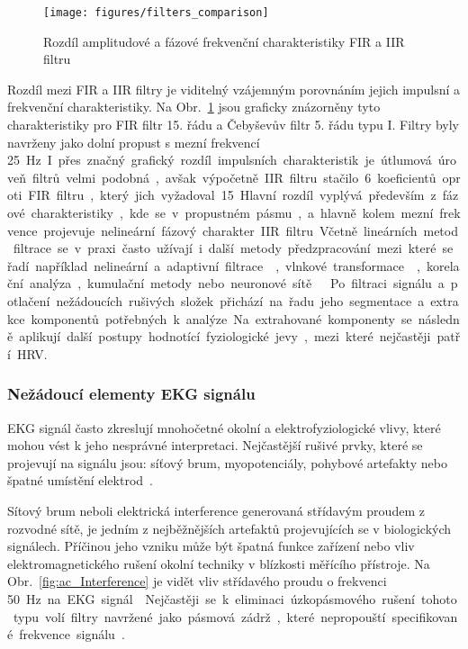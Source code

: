 \begin{figure}[h]
	\begin{center}
		\texttt{[image: figures/filters\_comparison]}
		\caption{Rozdíl amplitudové a fázové frekvenční charakteristiky FIR a IIR filtru}
		\label{fig:filters_comparison}
	\end{center}
\end{figure}

Rozdíl mezi FIR a IIR filtry je viditelný vzájemným porovnáním jejich impulsní a
frekvenční charakteristiky. Na Obr.~\ref{fig:filters_comparison} jsou graficky
znázorněny tyto charakteristiky pro FIR filtr 15. řádu a Čebyševův filtr 5. řádu
typu I. Filtry byly navrženy jako dolní propust s mezní frekvencí 25~\si\Hz. I
přes značný grafický rozdíl impulsních charakteristik je útlumová úroveň filtrů
velmi podobná, avšak výpočetně IIR filtru stačilo 6 koeficientů oproti FIR
filtru, který jich vyžadoval 15. Hlavní rozdíl vyplývá především z fázové
charakteristiky, kde se v propustném pásmu, a hlavně kolem mezní frekvence
projevuje nelineární fázový charakter IIR filtru.

Včetně lineárních metod filtrace se v praxi často užívají i další metody
předzpracování mezi které se řadí například nelineární a adaptivní
filtrace~\cite{Sornmo1982,Pan1985}, vlnkové
transformace~\cite{Yao2020,Ndiaye2020}, korelační analýza, kumulační metody nebo
neuronové sítě~\cite{Kiranyaz2016,Zhai2018}~\cite{Jan2002}. Po filtraci signálu
a potlačení nežádoucích rušivých složek přichází na řadu jeho segmentace a
extrakce komponentů potřebných k analýze. Na extrahované komponenty se následně
aplikují další postupy hodnotící fyziologické jevy, mezi které nejčastěji patří
HRV.

\subsubsection{Nežádoucí elementy EKG signálu}
\label{section:artifacts_theory}
EKG signál často zkreslují mnohočetné okolní a elektrofyziologické vlivy, které
mohou vést k jeho nesprávné interpretaci. Nejčastější rušivé prvky, které se
projevují na signálu jsou: síťový brum, myopotenciály, pohybové artefakty nebo
špatné umístění elektrod~\cite{Surawicz2008}.

Sítový brum neboli elektrická interference generovaná střídavým proudem z
rozvodné sítě, je jedním z nejběžnějších artefaktů projevujících se v
biologických signálech. Příčinou jeho vzniku může být špatná funkce zařízení nebo
vliv elektromagnetického rušení okolní techniky v blízkosti měřícího přístroje.
Na Obr.~\ref{fig:ac_Interference} je vidět vliv střídavého proudu o frekvenci
50~\si\Hz~na EKG signál~\cite{Goldberger2017}. Nejčastěji se k eliminaci
úzkopásmového rušení tohoto typu volí filtry navržené jako pásmová zádrž, které
nepropouští specifikované frekvence signálu~\cite{Kher2019}.

